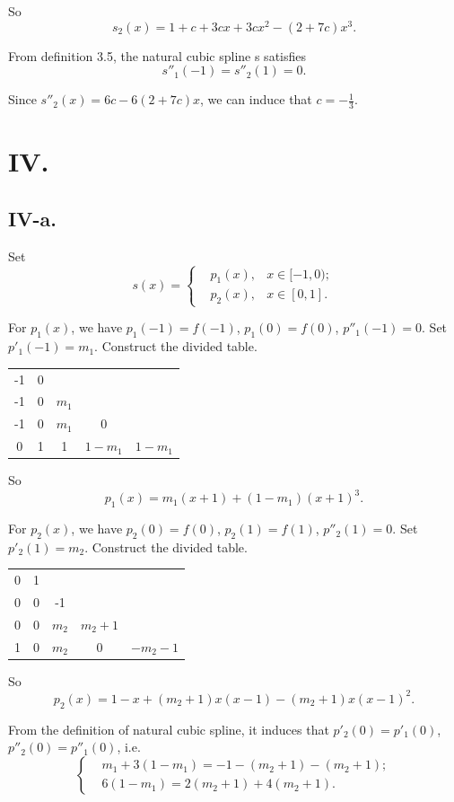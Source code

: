 \documentclass[a4paper]{article}
\begin{document}
So $$s_2(x)=1+c+3cx+3cx^2-(2+7c)x^3.$$

From definition 3.5, the natural cubic spline s satisfies 
$$s''_1(-1)=s''_2(1)=0.$$

Since $s''_2(x)=6c-6(2+7c)x$, we can induce that $c=-\frac{1}{3}$.

\section*{IV.}
\subsection*{IV-a.}
Set 
$$
s(x)=\left\{
\begin{aligned}
  &p_1(x), &x\in [-1,0);\\
  &p_2(x), &x\in [0,1].
\end{aligned}
\right.
$$

For $p_1(x)$, we have $p_1(-1)=f(-1)$, $p_1(0)=f(0)$, $p''_1(-1)=0$. Set $p'_1(-1)=m_1$. Construct the divided table.

\begin{table}[H]
  \centering
  \begin{tabular}{c|cccc}
    -1 & 0 & & & \\
    -1 & 0 & $m_1$ & &  \\
    -1 & 0 & $m_1$ & 0 & \\
    0 & 1 & 1 & $1-m_1$ & $1-m_1$ \\
  \end{tabular}
\end{table}

So $$p_1(x)=m_1(x+1)+(1-m_1)(x+1)^3.$$

For $p_2(x)$, we have $p_2(0)=f(0)$, $p_2(1)=f(1)$, $p''_2(1)=0$. Set $p'_2(1)=m_2$. Construct the divided table.

\begin{table}[H]
  \centering
  \begin{tabular}{c|cccc}
    0 & 1 & & & \\
    0 & 0 & -1 & &  \\
    0 & 0 & $m_2$ & $m_2+1$ & \\
    1 & 0 & $m_2$ & 0 & $-m_2-1$ \\
  \end{tabular}
\end{table}

So $$p_2(x)=1-x+(m_2+1)x(x-1)-(m_2+1)x(x-1)^2.$$

From the definition of natural cubic spline, it induces that $p'_2(0)=p'_1(0)$, $p''_2(0)=p''_1(0)$, i.e.
$$
\left\{
\begin{aligned}
  &m_1+3(1-m_1)=-1-(m_2+1)-(m_2+1);\\
  &6(1-m_1)=2(m_2+1)+4(m_2+1).
\end{aligned}
\right.
$$
\end{document}
